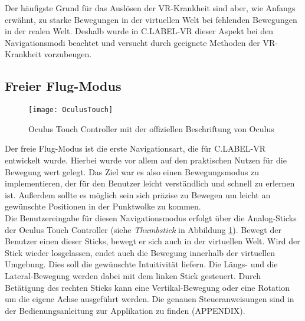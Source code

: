 Der häufigste Grund für das Auslösen der VR-Krankheit sind aber, wie Anfangs erwähnt, zu starke Bewegungen in der virtuellen Welt bei fehlenden Bewegungen in der realen Welt. Deshalb wurde in C.LABEL-VR dieser Aspekt bei den Navigationsmodi beachtet und versucht durch geeignete Methoden der VR-Krankheit vorzubeugen. 


\subsection{Freier Flug-Modus}
\label{sec:FreeFlyMode}

\begin{figure}%
	\centering
    \texttt{[image: OculusTouch]}
    \caption{Oculus Touch Controller mit der offiziellen Beschriftung von Oculus \cite{bib:OculusTouchPic}}
    \label{fig:OculusTouchPic}
\end{figure}

Der freie Flug-Modus ist die erste Navigationsart, die für C.LABEL-VR entwickelt wurde. Hierbei wurde vor allem auf den praktischen Nutzen für die Bewegung wert gelegt. Das Ziel war es also einen Bewegungsmodus zu implementieren, der für den Benutzer leicht verständlich und schnell zu erlernen ist. Außerdem sollte es möglich sein sich präzise zu Bewegen um leicht an gewünschte Positionen in der Punktwolke zu kommen.\\

Die Benutzereingabe für diesen Navigationsmodus erfolgt über die Analog-Sticks der Oculus Touch Controller (siehe \textit{Thumbstick} in Abbildung \ref{fig:OculusTouchPic}). Bewegt der Benutzer einen dieser Sticks, bewegt er sich auch in der virtuellen Welt. Wird der Stick wieder losgelassen, endet auch die Bewegung innerhalb der virtuellen Umgebung. Dies soll die gewünschte Intuitivität liefern. Die Längs- und die Lateral-Bewegung werden dabei mit dem linken Stick gesteuert. Durch Betätigung des rechten Sticks kann eine Vertikal-Bewegung oder eine Rotation um die eigene Achse ausgeführt werden. Die genauen Steueranweisungen sind in der Bedienungsanleitung zur Applikation zu finden (APPENDIX).\\

